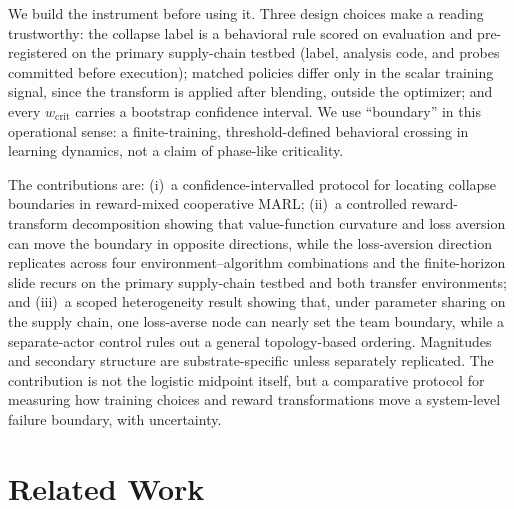 \documentclass[letterpaper]{article} %
\theoremstyle{plain}
\newcommand{\wcrit}{w_{\mathrm{crit}}}
\begin{document}
We build the instrument before using it. Three design choices make a reading trustworthy: the collapse
label is a behavioral rule scored on evaluation and pre-registered on the primary supply-chain testbed
(label, analysis code, and probes committed before execution); matched policies differ only in the
scalar training signal, since the transform is applied after blending, outside the optimizer; and every
$\wcrit$ carries a bootstrap confidence interval. We use ``boundary'' in this operational sense: a
finite-training, threshold-defined behavioral crossing in learning dynamics, not a claim of phase-like
criticality.

The contributions are: (i)~a confidence-intervalled protocol for locating collapse boundaries in
reward-mixed cooperative MARL; (ii)~a controlled reward-transform decomposition showing that
value-function curvature and loss aversion can move the boundary in opposite directions, while the
loss-aversion direction replicates across four environment--algorithm combinations and the
finite-horizon slide recurs on the primary supply-chain testbed and both transfer environments; and
(iii)~a scoped heterogeneity result showing that, under parameter sharing on the
supply chain, one loss-averse node can nearly set the team boundary, while a separate-actor control
rules out a general topology-based ordering. Magnitudes and secondary structure are substrate-specific
unless separately replicated. The contribution is not the logistic midpoint itself, but a comparative
protocol for measuring how training choices and reward transformations move a system-level failure
boundary, with uncertainty.

\section{Related Work}
\label{sec:related}
\end{document}

